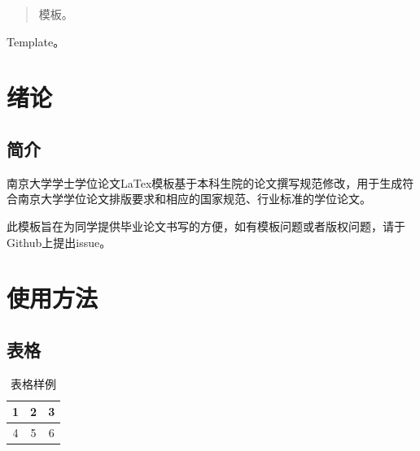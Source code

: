 \documentclass[
    TitleLength = 1,%
    TitleOne = 曲率引擎的研究,%
    TitleTwo =,%
    TitleThree =,%
    Title_EN = Curvature engine research,
    Grade = 17,
    StudentID = 17184xxx,
    StudentName = 张三,
    StudentName_EN = ZhangSan,
    Department = 未来学院,
    Department_EN = School of future,
    Major = 未来学,
    Major_EN = Future,
    Mentor = 李四,
    Mentor_EN = LiSi,
    MentorTitle = 教授,
    MentorTitle_EN = Professor,
    SubmitDate = 2077年12月31日,
    Degree = 本科,%
    Type = thesis%
]{njuthesis}
\begin{document}
\maketitle


\begin{abstract}
    模板。
\end{abstract}

\begin{englishabstract}
    Template。
  \end{englishabstract}

\tableofcontents
\mainmatter

\chapter{绪论}
    \section{简介}
    南京大学学士学位论文LaTex模板\cite{njuthesis}基于本科生院的论文撰写规范修改，用于生成符合南京大学学位论文排版要求和相应的国家规范、行业标准的学位论文。

    此模板旨在为同学提供毕业论文书写的方便，如有模板问题或者版权问题，请于Github上提出issue。
\chapter{使用方法}
    \section{表格}
    \begin{table}[htbp]
        \centering
        \caption{表格样例}
        \begin{tabular}{|c|c|c|}
            \hline
            1 & 2 & 3 \\
            \hline
            4 &  5 & 6 \\
            \hline
        \end{tabular}
    \end{table}
\end{document}
